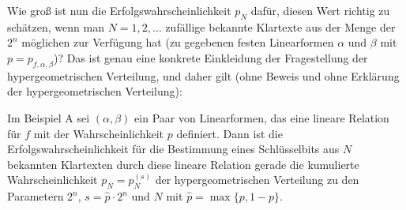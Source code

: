 \begin{refsegment}
Wie groß ist nun die Erfolgswahrscheinlichkeit $p_N$ dafür, diesen Wert
richtig zu schätzen, wenn man $N = 1, 2, \ldots$ zufällige bekannte
Klartexte
aus der Menge der $2^n$ möglichen zur Verfügung hat (zu gegebenen festen
Linearformen $\alpha$ und $\beta$ mit $p = p_{f,\alpha,\beta}$)? Das ist genau
eine konkrete Einkleidung der Fragestellung der hypergeometrischen Verteilung,
und daher gilt
(ohne Beweis und ohne Erklärung der hypergeometrischen
Verteilung):

\begin{satz}
  Im Beispiel A sei $(\alpha,\beta)$ ein Paar von Linearformen, das
  eine lineare Relation für $f$ mit der Wahrscheinlichkeit $p$ definiert.
  Dann ist die Erfolgswahrscheinlichkeit für die Bestimmung eines
  Schlüsselbits aus $N$ bekannten Klartexten durch diese lineare
  Relation
  gerade die kumulierte Wahrscheinlichkeit $p_N = p_N^{(s)}$ der
  hypergeometrischen Verteilung zu den Parametern $2^n$, $s = \hat{p}\cdot 2^n$
  und $N$ mit $\hat{p} = \max\{p, 1-p\}$.
\end{satz}


\end{refsegment}
